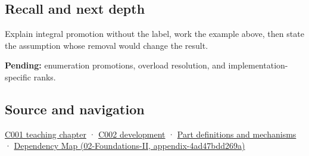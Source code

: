 \subsection{Recall and next depth}\label{appendix-45303d03796a-recall-and-next-depth}

Explain integral promotion without the label, work the example above, then state the assumption whose removal would change the result.

\textbf{Pending:} enumeration promotions, overload resolution, and implementation-specific ranks.

\subsection{Source and navigation}\label{appendix-45303d03796a-source-and-navigation}

\hyperref[01-foundations-i-ch001-from-a-signal-to-an-interpretation]{C001 teaching chapter} · \hyperref[01-foundations-i-ch001-arithmetic-becomes-a-policy]{C002 development} · \hyperref[appendix-fd090d982a15]{Part definitions and mechanisms} · \href{../02-Foundations-II/main.pdf\#nameddest=appendix-4ad47bdd269a}{Dependency Map (02-Foundations-II, appendix-4ad47bdd269a)}
